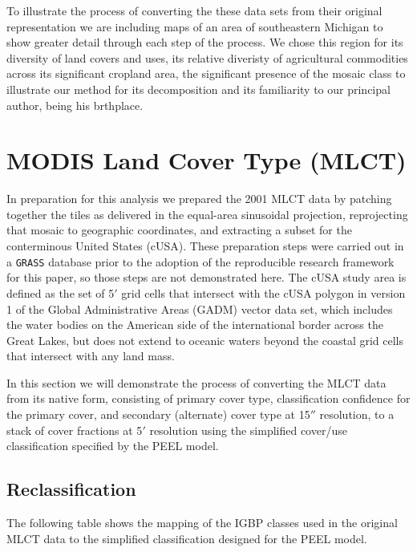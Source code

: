 To illustrate the process of converting the these data sets from their
original representation we are including maps of an area of
southeastern Michigan to show greater detail through each step of the
process.  We chose this region for its diversity of land covers and
uses, its relative diveristy of agricultural commodities across its
significant cropland area, the significant presence of the mosaic
class to illustrate our method for its decomposition and its
familiarity to our principal author, being his brthplace.


\section{MODIS Land Cover Type (MLCT)}
\label{sec:mlct}

In preparation for this analysis we prepared the 2001 MLCT data by
patching together the tiles as delivered in the equal-area sinusoidal
projection, reprojecting that mosaic to geographic coordinates, and
extracting a subset for the conterminous United States (cUSA).  These
preparation steps were carried out in a \texttt{GRASS} database prior
to the adoption of the reproducible research framework for this paper,
so those steps are not demonstrated here.  The cUSA study area is
defined as the set of 5$'$ grid cells that intersect with the cUSA
polygon in version 1 of the Global Administrative Areas (GADM) vector
data set, which includes the water bodies on the American side of the
international border across the Great Lakes, but does not extend to
oceanic waters beyond the coastal grid cells that intersect with any
land mass.

In this section we will demonstrate the process of converting the MLCT
data from its native form, consisting of primary cover type,
classification confidence for the primary cover, and secondary
(alternate) cover type at 15$''$ resolution, to a stack of cover
fractions at 5$'$ resolution using the simplified cover/use
classification specified by the PEEL model.

\subsection{Reclassification}
\label{sec:mlct-reclass}

The following table shows the mapping of the IGBP classes used in the
original MLCT data to the simplified classification designed for the
PEEL model.

